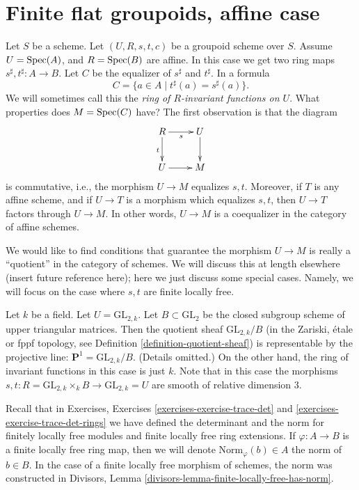 \section{Finite flat groupoids, affine case}
\label{section-finite-flat}

\noindent
Let $S$ be a scheme.
Let $(U, R, s, t, c)$ be a groupoid scheme over $S$.
Assume $U = \mathop{\mathrm{Spec}}(A)$, and $R = \mathop{\mathrm{Spec}}(B)$ are affine.
In this case we get two ring maps
$s^\sharp, t^\sharp : A \longrightarrow B$.
Let $C$ be the equalizer of $s^\sharp$ and $t^\sharp$. In a formula
\begin{equation}
\label{equation-invariants}
C = \{a \in A \mid t^\sharp(a) = s^\sharp(a) \}.
\end{equation}
We will sometimes call this the {\it ring of $R$-invariant functions on $U$}.
What properties does $M = \mathop{\mathrm{Spec}}(C)$ have? The first observation is
that the diagram
$$
\xymatrix{
R \ar[r]_s \ar[d]_t & U \ar[d] \\
U \ar[r] & M
}
$$
is commutative, i.e., the morphism $U \to M$ equalizes $s, t$.
Moreover, if $T$ is any affine scheme, and if $U \to T$ is
a morphism which equalizes $s, t$, then $U \to T$ factors through $U \to M$.
In other words, $U \to M$ is a coequalizer in the category of affine schemes.

\medskip\noindent
We would like to find conditions that guarantee the morphism $U \to M$ is
really a ``quotient'' in the category of schemes. We will discuss this at
length elsewhere (insert future reference here); here we just discuss some
special cases. Namely, we will focus on the case where $s, t$ are finite
locally free.

\begin{example}
\label{example-quotient-projective-line}
Let $k$ be a field. Let $U = \text{GL}_{2, k}$. Let $B \subset \text{GL}_2$
be the closed subgroup scheme of upper triangular matrices.
Then the quotient sheaf $\text{GL}_{2, k}/B$ (in the Zariski, \'etale or
fppf topology, see Definition \ref{definition-quotient-sheaf}) is
representable by the projective line: $\mathbf{P}^1 = \text{GL}_{2, k}/B$.
(Details omitted.)
On the other hand, the ring of invariant functions in this case is just $k$.
Note that in this case the morphisms
$s, t : R = \text{GL}_{2, k} \times_k B \to \text{GL}_{2, k} = U$ are smooth
of relative dimension $3$.
\end{example}

\noindent
Recall that in Exercises, Exercises \ref{exercises-exercise-trace-det} and
\ref{exercises-exercise-trace-det-rings} we have defined the determinant
and the norm for finitely locally free modules and finite locally free ring
extensions. If $\varphi : A \to B$ is a finite locally free ring map, then
we will denote $\text{Norm}_\varphi(b) \in A$ the norm of $b \in B$. In the
case of a finite locally free morphism of schemes, the norm was constructed
in Divisors, Lemma \ref{divisors-lemma-finite-locally-free-has-norm}.

